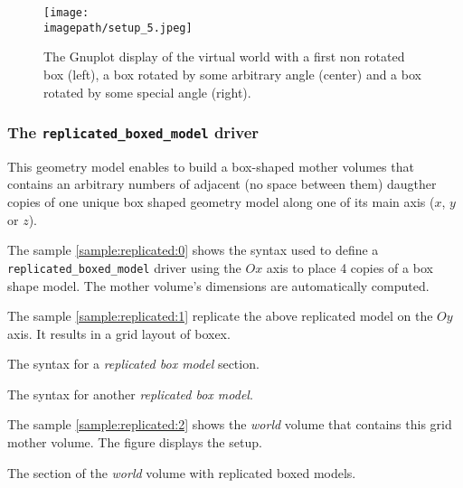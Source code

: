 \begin{figure}[h]
\begin{center}
\texttt{[image: \\imagepath/setup\_5.jpeg]}
\end{center}
\caption{The Gnuplot  display of  the virtual world  with a  first non
  rotated box (left),  a box rotated by some  arbitrary angle (center)
  and a box rotated by some special angle (right).}
\label{fig:setup_5:0}
\end{figure}

\subsubsection{The \texttt{replicated\_boxed\_model} driver}

This geometry model enables to  build a box-shaped mother volumes that
contains  an arbitrary  numbers of  adjacent (no  space  between them)
daugther copies of  one unique box shaped geometry  model along one of
its main axis ($x$, $y$ or $z$).

The sample \ref{sample:replicated:0} shows the syntax used to define a
\texttt{replicated\_boxed\_model} driver using  the $Ox$ axis to place
4 copies  of a  box shape model.   The mother volume's  dimensions are
automatically computed.

The sample \ref{sample:replicated:1} replicate the above replicated
model on the $Oy$ axis. It results in a grid layout of boxex.

\begin{sample}[h]
\caption{The syntax for a \emph{replicated box model} section.}
\label{sample:replicated:0}
\end{sample}


\begin{sample}[h]
\caption{The  syntax for another  \emph{replicated box  model}.}
\label{sample:replicated:1}
\end{sample}

The  sample \ref{sample:replicated:2}  shows the  \emph{world}  volume that
contains this grid mother volume. The figure \label{fig:setup_6:0} displays
the setup.

\begin{sample}[h]
\caption{The section of the \emph{world} volume with replicated boxed models.}
\label{sample:replicated:2}
\end{sample}

